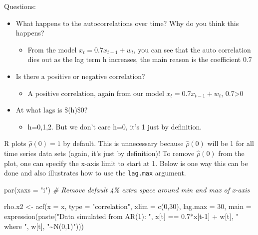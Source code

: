 \documentclass[
]{book}
\newenvironment{Shaded}{\begin{snugshade}}{\end{snugshade}}
\newcommand{\AttributeTok}[1]{\textcolor[rgb]{0.77,0.63,0.00}{#1}}
\newcommand{\CommentTok}[1]{\textcolor[rgb]{0.56,0.35,0.01}{\textit{#1}}}
\newcommand{\DecValTok}[1]{\textcolor[rgb]{0.00,0.00,0.81}{#1}}
\newcommand{\FloatTok}[1]{\textcolor[rgb]{0.00,0.00,0.81}{#1}}
\newcommand{\FunctionTok}[1]{\textcolor[rgb]{0.00,0.00,0.00}{#1}}
\newcommand{\NormalTok}[1]{#1}
\newcommand{\OtherTok}[1]{\textcolor[rgb]{0.56,0.35,0.01}{#1}}
\newcommand{\SpecialCharTok}[1]{\textcolor[rgb]{0.00,0.00,0.00}{#1}}
\newcommand{\StringTok}[1]{\textcolor[rgb]{0.31,0.60,0.02}{#1}}
\providecommand{\tightlist}{%
  \setlength{\itemsep}{0pt}\setlength{\parskip}{0pt}}
\theoremstyle{definition}
\theoremstyle{definition}
\theoremstyle{definition}
\theoremstyle{definition}
\theoremstyle{remark}
\begin{document}
Questions:

\begin{itemize}
\tightlist
\item
  What happens to the autocorrelations over time? Why do you think this happens?

  \begin{itemize}
  \tightlist
  \item
    From the model \(x_t=0.7x_{t-1}+w_t\), you can see that the auto correlation dies out as the lag term h increases, the main reason is the coefficient 0.7
  \end{itemize}
\item
  Is there a positive or negative correlation?

  \begin{itemize}
  \tightlist
  \item
    A positive correlation, again from our model \(x_t=0.7x_{t-1}+w_t\), 0.7\textgreater0
  \end{itemize}
\item
  At what lags is \$\rho(h)\ne\$0?

  \begin{itemize}
  \tightlist
  \item
    h=0,1,2. But we don't care h=0, it's 1 just by definition.
  \end{itemize}
\end{itemize}

R plots \(\hat{\rho}(0)=1\) by default. This is unnecessary because \(\hat{\rho}(0)\) will be 1 for all time series data sets (again, it's just by definition)! To remove \(\hat{\rho}(0)\) from the plot, one can specify the x-axis limit to start at 1. Below is one way this can be done and also illustrates how to use the \texttt{lag.max} argument.

\begin{Shaded}
\begin{Highlighting}[]
\FunctionTok{par}\NormalTok{(}\AttributeTok{xaxs =} \StringTok{"i"}\NormalTok{) }
\CommentTok{\# Remove default 4\% extra space around  min and max of x{-}axis}

\NormalTok{rho.x2 }\OtherTok{\textless{}{-}} \FunctionTok{acf}\NormalTok{(}\AttributeTok{x =}\NormalTok{ x, }\AttributeTok{type =} \StringTok{"correlation"}\NormalTok{, }\AttributeTok{xlim =} 
    \FunctionTok{c}\NormalTok{(}\DecValTok{0}\NormalTok{,}\DecValTok{30}\NormalTok{), }\AttributeTok{lag.max =} \DecValTok{30}\NormalTok{, }\AttributeTok{main =} \FunctionTok{expression}\NormalTok{(}\FunctionTok{paste}\NormalTok{(}\StringTok{"Data }
\StringTok{    simulated from AR(1): "}\NormalTok{, x[t] }\SpecialCharTok{==} \FloatTok{0.7}\SpecialCharTok{*}\NormalTok{x[t}\DecValTok{{-}1}\NormalTok{] }\SpecialCharTok{+}\NormalTok{ w[t], }\StringTok{" }
\StringTok{    where "}\NormalTok{, w[t], }\StringTok{"\textasciitilde{}N(0,1)"}\NormalTok{)))}
\end{Highlighting}
\end{Shaded}
\end{document}

